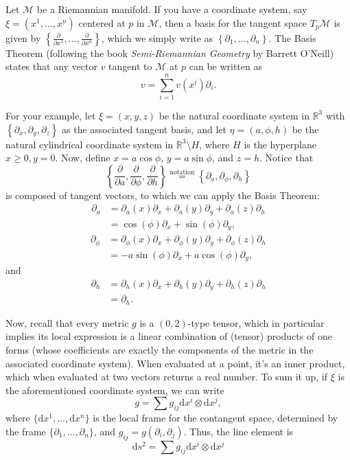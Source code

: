 \documentclass{article}
\begin{document}
Let $\mathcal{M}$ be a Riemannian manifold. If you have a coordinate system, say $\xi=\left(x^{1},\ldots,x^{n}\right)$ centered at $p$ in $\mathcal{M}$, then a basis for the tangent space $T_p \mathcal{M}$ is given by $\left\{\frac{\partial}{\partial x^{1}}, \ldots, \frac{\partial}{\partial x^{n}}\right\}$, which we simply write as $\left\{\partial_1, \ldots, \partial_n \right\}$. The Basis Theorem (following the book \textit{Semi-Riemannian Geometry} by Barrett O'Neill) states that any vector $v$ tangent to $\mathcal{M}$ at $p$ can be written as 
\[
v = \sum_{i=1}^{n} v(x^{i}) \partial_i.
\]

For your example, let $\xi = (x,y,z)$ be the natural coordinate system in $\mathbb{R}^{3}$ with $\left\{\partial_x, \partial_y, \partial_z\right\}$ as the associated tangent basis, and let $\eta = (a,\phi,h)$ be the natural cylindrical coordinate system in $\mathbb{R}^{3} \setminus H$, where $H$ is the hyperplane $x \geq 0, y=0$. Now, define $x = a \cos\phi$, $y = a \sin\phi$, and $z = h$. Notice that 
\[
\left\{\frac{\partial}{\partial a}, \frac{\partial}{\partial \phi}, \frac{\partial}{\partial h}\right\} \stackrel{\text{notation}}{=} \left\{\partial_a, \partial_\phi, \partial_h\right\}
\]
is composed of tangent vectors, to which we can apply the Basis Theorem:
\begin{align*}
   \partial_a &= \partial_a(x)\partial_x + \partial_a(y)\partial_y + \partial_a(z)\partial_h \\
              &= \cos(\phi)\partial_x + \sin(\phi)\partial_y,
\end{align*}
\begin{align*}
   \partial_\phi &= \partial_\phi(x)\partial_x + \partial_\phi(y)\partial_y + \partial_\phi(z)\partial_h \\
              &= -a\sin(\phi)\partial_x + a\cos(\phi)\partial_y,
\end{align*}
and
\begin{align*}
     \partial_h &= \partial_h(x)\partial_x + \partial_h(y)\partial_y + \partial_h(z)\partial_h \\
                &= \partial_h.
\end{align*}

Now, recall that every metric $g$ is a $(0,2)$-type tensor, which in particular implies its local expression is a linear combination of (tensor) products of one forms (whose coefficients are exactly the components of the metric in the associated coordinate system). When evaluated at a point, it's an inner product, which when evaluated at two vectors returns a real number. To sum it up, if $\xi$ is the aforementioned coordinate system, we can write
\[
g = \sum g_{ij} \mathrm{d}x^{i} \otimes \mathrm{d} x^{j},
\]
where $\{\mathrm{d}x^{1}, \ldots, \mathrm{d}x^{n}\}$ is the local frame for the contangent space, determined by the frame $\{ \partial_1, \ldots, \partial_n \}$, and $g_{ij} = g\left(\partial_i,\partial_j \right)$. Thus, the line element is
\[
\mathrm{d}s^{2} = \sum  g_{ij}\mathrm{d}x^{i} \otimes \mathrm{d} x^{j}
\]
\end{document}
